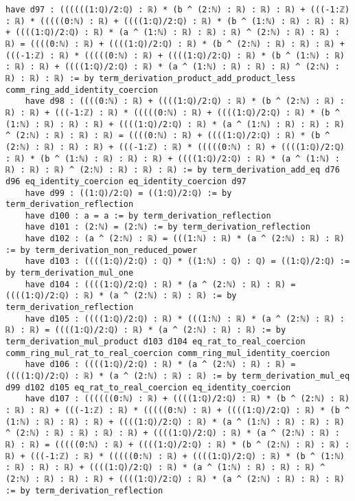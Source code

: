 \documentclass{article}
\begin{document}
\begin{tcolorbox}[colback=white!10, width=\linewidth]
\begin{lstlisting}[language=Lean4]
    have d97 : ((((((1:ℚ)/2:ℚ) : ℝ) * (b ^ (2:ℕ) : ℝ) : ℝ) : ℝ) + (((-1:ℤ) : ℝ) * (((((0:ℕ) : ℝ) + ((((1:ℚ)/2:ℚ) : ℝ) * (b ^ (1:ℕ) : ℝ) : ℝ) : ℝ) + ((((1:ℚ)/2:ℚ) : ℝ) * (a ^ (1:ℕ) : ℝ) : ℝ) : ℝ) ^ (2:ℕ) : ℝ) : ℝ) : ℝ) = ((((0:ℕ) : ℝ) + ((((1:ℚ)/2:ℚ) : ℝ) * (b ^ (2:ℕ) : ℝ) : ℝ) : ℝ) + (((-1:ℤ) : ℝ) * (((((0:ℕ) : ℝ) + ((((1:ℚ)/2:ℚ) : ℝ) * (b ^ (1:ℕ) : ℝ) : ℝ) : ℝ) + ((((1:ℚ)/2:ℚ) : ℝ) * (a ^ (1:ℕ) : ℝ) : ℝ) : ℝ) ^ (2:ℕ) : ℝ) : ℝ) : ℝ) := by term_derivation_product_add_product_less comm_ring_add_identity_coercion
    have d98 : ((((0:ℕ) : ℝ) + ((((1:ℚ)/2:ℚ) : ℝ) * (b ^ (2:ℕ) : ℝ) : ℝ) : ℝ) + (((-1:ℤ) : ℝ) * (((((0:ℕ) : ℝ) + ((((1:ℚ)/2:ℚ) : ℝ) * (b ^ (1:ℕ) : ℝ) : ℝ) : ℝ) + ((((1:ℚ)/2:ℚ) : ℝ) * (a ^ (1:ℕ) : ℝ) : ℝ) : ℝ) ^ (2:ℕ) : ℝ) : ℝ) : ℝ) = ((((0:ℕ) : ℝ) + ((((1:ℚ)/2:ℚ) : ℝ) * (b ^ (2:ℕ) : ℝ) : ℝ) : ℝ) + (((-1:ℤ) : ℝ) * (((((0:ℕ) : ℝ) + ((((1:ℚ)/2:ℚ) : ℝ) * (b ^ (1:ℕ) : ℝ) : ℝ) : ℝ) + ((((1:ℚ)/2:ℚ) : ℝ) * (a ^ (1:ℕ) : ℝ) : ℝ) : ℝ) ^ (2:ℕ) : ℝ) : ℝ) : ℝ) := by term_derivation_add_eq d76 d96 eq_identity_coercion eq_identity_coercion d97
    have d99 : ((1:ℚ)/2:ℚ) = ((1:ℚ)/2:ℚ) := by term_derivation_reflection
    have d100 : a = a := by term_derivation_reflection
    have d101 : (2:ℕ) = (2:ℕ) := by term_derivation_reflection
    have d102 : (a ^ (2:ℕ) : ℝ) = (((1:ℕ) : ℝ) * (a ^ (2:ℕ) : ℝ) : ℝ) := by term_derivation_non_reduced_power
    have d103 : ((((1:ℚ)/2:ℚ) : ℚ) * ((1:ℕ) : ℚ) : ℚ) = ((1:ℚ)/2:ℚ) := by term_derivation_mul_one
    have d104 : ((((1:ℚ)/2:ℚ) : ℝ) * (a ^ (2:ℕ) : ℝ) : ℝ) = ((((1:ℚ)/2:ℚ) : ℝ) * (a ^ (2:ℕ) : ℝ) : ℝ) := by term_derivation_reflection
    have d105 : ((((1:ℚ)/2:ℚ) : ℝ) * (((1:ℕ) : ℝ) * (a ^ (2:ℕ) : ℝ) : ℝ) : ℝ) = ((((1:ℚ)/2:ℚ) : ℝ) * (a ^ (2:ℕ) : ℝ) : ℝ) := by term_derivation_mul_product d103 d104 eq_rat_to_real_coercion comm_ring_mul_rat_to_real_coercion comm_ring_mul_identity_coercion
    have d106 : ((((1:ℚ)/2:ℚ) : ℝ) * (a ^ (2:ℕ) : ℝ) : ℝ) = ((((1:ℚ)/2:ℚ) : ℝ) * (a ^ (2:ℕ) : ℝ) : ℝ) := by term_derivation_mul_eq d99 d102 d105 eq_rat_to_real_coercion eq_identity_coercion
    have d107 : ((((((0:ℕ) : ℝ) + ((((1:ℚ)/2:ℚ) : ℝ) * (b ^ (2:ℕ) : ℝ) : ℝ) : ℝ) + (((-1:ℤ) : ℝ) * (((((0:ℕ) : ℝ) + ((((1:ℚ)/2:ℚ) : ℝ) * (b ^ (1:ℕ) : ℝ) : ℝ) : ℝ) + ((((1:ℚ)/2:ℚ) : ℝ) * (a ^ (1:ℕ) : ℝ) : ℝ) : ℝ) ^ (2:ℕ) : ℝ) : ℝ) : ℝ) : ℝ) + ((((1:ℚ)/2:ℚ) : ℝ) * (a ^ (2:ℕ) : ℝ) : ℝ) : ℝ) = (((((0:ℕ) : ℝ) + ((((1:ℚ)/2:ℚ) : ℝ) * (b ^ (2:ℕ) : ℝ) : ℝ) : ℝ) + (((-1:ℤ) : ℝ) * (((((0:ℕ) : ℝ) + ((((1:ℚ)/2:ℚ) : ℝ) * (b ^ (1:ℕ) : ℝ) : ℝ) : ℝ) + ((((1:ℚ)/2:ℚ) : ℝ) * (a ^ (1:ℕ) : ℝ) : ℝ) : ℝ) ^ (2:ℕ) : ℝ) : ℝ) : ℝ) + ((((1:ℚ)/2:ℚ) : ℝ) * (a ^ (2:ℕ) : ℝ) : ℝ) : ℝ) := by term_derivation_reflection

\end{lstlisting}
\end{tcolorbox}
\end{document}
